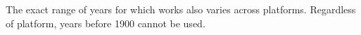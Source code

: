 The exact range of years for which  works also
varies across platforms.  Regardless of platform, years before 1900
cannot be used.


\begin{comment}

\subsection{C API}

Struct typedefs:

    PyDateTime_Date
    PyDateTime_DateTime
    PyDateTime_DateTimeTZ
    PyDateTime_Time
    PyDateTime_TimeTZ
    PyDateTime_Delta
    PyDateTime_TZInfo

Type-check macros:

    PyDate_Check(op)
    PyDate_CheckExact(op)

    PyDateTime_Check(op)
    PyDateTime_CheckExact(op)

    PyDateTimeTZ_Check(op)
    PyDateTimeTZ_CheckExact(op)

    PyTime_Check(op)
    PyTime_CheckExact(op)

    PyTimeTZ_Check(op)
    PyTimeTZ_CheckExact(op)

    PyDelta_Check(op)
    PyDelta_CheckExact(op)

    PyTZInfo_Check(op)
    PyTZInfo_CheckExact(op

Accessor macros:

All objects are immutable, so accessors are read-only.  All macros
return ints:

    For \class{date}, \class{datetime}, and \class{datetimetz} instances:
        PyDateTime_GET_YEAR(o)
        PyDateTime_GET_MONTH(o)
        PyDateTime_GET_DAY(o)

    For \class{datetime} and \class{datetimetz} instances:
        PyDateTime_DATE_GET_HOUR(o)
        PyDateTime_DATE_GET_MINUTE(o)
        PyDateTime_DATE_GET_SECOND(o)
        PyDateTime_DATE_GET_MICROSECOND(o)

    For \class{time} and \class{timetz} instances:
        PyDateTime_TIME_GET_HOUR(o)
        PyDateTime_TIME_GET_MINUTE(o)
        PyDateTime_TIME_GET_SECOND(o)
        PyDateTime_TIME_GET_MICROSECOND(o)

\end{comment}
